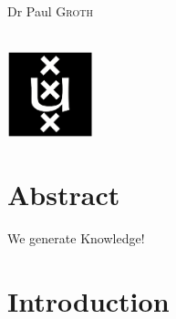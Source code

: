 \documentclass{article}
\newcommand{\red}[1]{{\color{red}{#1}}}
\begin{document}
\begin{titlepage}
\begin{minipage}[t]{0.4\textwidth}
\begin{flushright}
Dr Paul \textsc{Groth}\\

\end{flushright}

\end{minipage}\\[2cm]









\includegraphics[width=2.5cm]{data/images/uva.png}\\ %


 




\vfill %



\end{titlepage}

\section*{Abstract}
We generate Knowledge! \cite{kipf_contrastive_2020}

% 

\section{Introduction}

\end{document}
